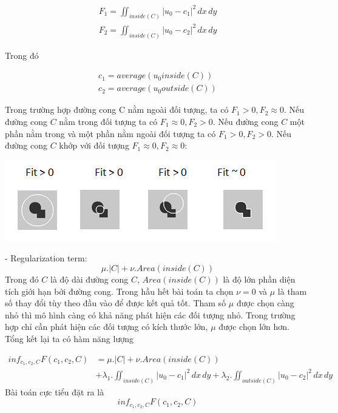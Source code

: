 \documentclass[12pt,oneside,a4]{report}
\begin{document}
\begin{center}
\begin{align}
F_1=\iint_{inside(C)} |u_0-c_1|^2 \,dx\,dy\\
F_2=\iint_{inside(C)} |u_0-c_2|^2 \,dx\,dy
\end{align}
\end{center}
Trong đó
\begin{center}
\begin{align}
c_1=average(u_0 inside(C))\\
c_2=average(u_0 outside(C))
\end{align}
\end{center} 
Trong trường hợp đường cong C nằm ngoài đối tượng, ta có $F_1>0, F_2\approx 0$. Nếu đường cong $C$ nằm trong đối tượng ta có $F_1 \approx0, F_2> 0$. Nếu đường cong $C$ một phần nằm trong và một phần nằm ngoài đối tượng ta có $F_1>0, F_2> 0$. Nếu đường cong $C$ khớp với đối tượng $F_1 \approx 0, F_2\approx 0$:
\begin{center}
\includegraphics[scale=1]{figure/fitting.png}
\end{center}
- Regularization term:
\begin{equation}
\mu .|C|+\nu .Area(inside(C))
\end{equation}
Trong đó $C$ là độ dài đường cong $C$, $Area(inside(C))$ là độ lớn phần diện tích giới hạn bởi đường cong. Trong hầu hết bài toán ta chọn $\nu=0$ và $\mu$ là tham số thay đổi tùy theo đầu vào để được kết quả tốt. Tham số $\mu $ được chọn càng nhỏ thì mô hình càng có khả năng phát hiện các đối tượng nhỏ. Trong trường hợp chỉ cần phát hiện các đối tượng có kích thước lớn, $\mu$ được chọn lớn hơn.\\

Tổng kết lại ta có hàm năng lượng

\begin{equation}
\begin{split}
inf_{c_1,c_2,C} F(c_1, c_2, C)&=\mu .|C|+\nu .Area(inside(C)) \\ 
&+\lambda_1 .\iint_{inside(C)} |u_0-c_1|^2 \,dx\,dy+\lambda_2 .\iint_{outside(C)} |u_0-c_2|^2 \,dx\,dy
\end{split}
\end{equation}
Bài toán cực tiểu đặt ra là
\begin{equation}
inf_{c_1,c_2,C} F(c_1, c_2, C)
\end{equation}
 
\end{document}

